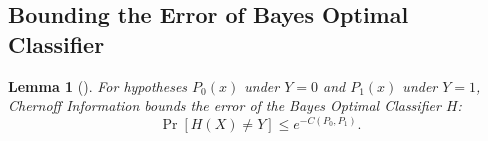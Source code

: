 \documentclass[11pt,letterpaper]{article}
\newtheorem{lemma}{Lemma}
\begin{document}
\setcounter{theorem}{0}




\subsection{Bounding the Error of Bayes Optimal Classifier}

\begin{lemma} 
    [\citep{nielsen2011}] \label{lem:bound2} For hypotheses $P_0(x)$ under $Y=0$ and $P_1(x)$ under $Y=1$, Chernoff Information bounds the error of the Bayes Optimal Classifier $H$:
    $$\Pr[H(X) \neq Y] \leq e^{-C(P_0, P_1)}.$$
\end{lemma}
\end{document}
